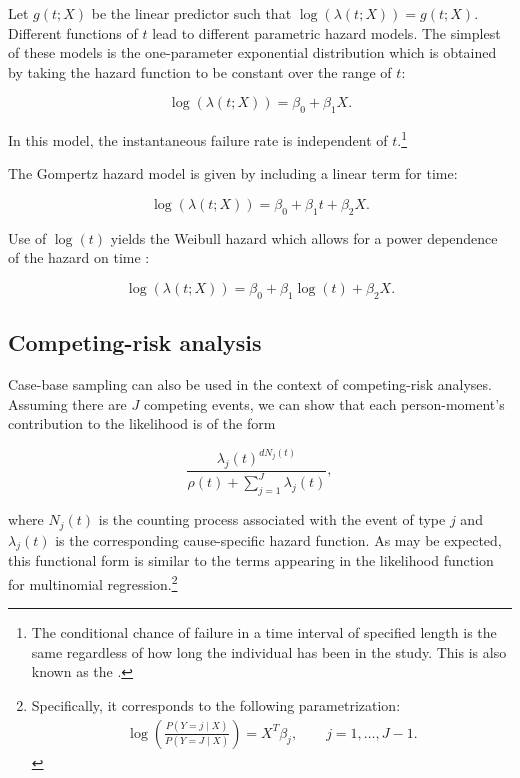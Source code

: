 Let \(g(t; X)\) be the linear predictor such that
\(\log(\lambda(t;X)) = g(t; X)\). Different functions of \(t\) lead to
different parametric hazard models. The simplest of these models is the
one-parameter exponential distribution which is obtained by taking the
hazard function to be constant over the range of \(t\):

\begin{equation}
\log(\lambda(t; X)) = \beta_0 + \beta_1 X. \label{eq:exp}
\end{equation}

In this model, the instantaneous failure rate is independent of
\(t\).\footnote{The conditional chance of failure in a time interval of specified length is the same regardless of how long the individual has been in the study. This is also known as the  \citep{kalbfleisch2011statistical}.}

The Gompertz hazard model is given by including a linear term for time:

\begin{equation}
\log(\lambda(t; X)) = \beta_0 + \beta_1 t + \beta_2 X. \label{eq:gomp}
\end{equation}

Use of \(\log(t)\) yields the Weibull hazard which allows for a power
dependence of the hazard on time \citep{kalbfleisch2011statistical}:

\begin{equation}
\log(\lambda(t; X)) = \beta_0 + \beta_1 \log(t) + \beta_2 X. \label{eq:weibull}
\end{equation}

\hypertarget{competing-risk-analysis}{%
\subsection{Competing-risk analysis}\label{competing-risk-analysis}}

Case-base sampling can also be used in the context of competing-risk
analyses. Assuming there are \(J\) competing events, we can show that
each person-moment's contribution to the likelihood is of the form

\[\frac{\lambda_j(t)^{dN_j(t)}}{\rho(t) + \sum_{j=1}^J\lambda_j(t)},\]

where \(N_j(t)\) is the counting process associated with the event of
type \(j\) and \(\lambda_j(t)\) is the corresponding cause-specific
hazard function. As may be expected, this functional form is similar to
the terms appearing in the likelihood function for multinomial
regression.\footnote{Specifically, it corresponds to the following parametrization: \begin{align*} \log\left(\frac{P(Y=j \mid X)}{P(Y = J \mid X)}\right) = X^T\beta_j, \qquad j = 1,\ldots, J-1.\end{align*}}

